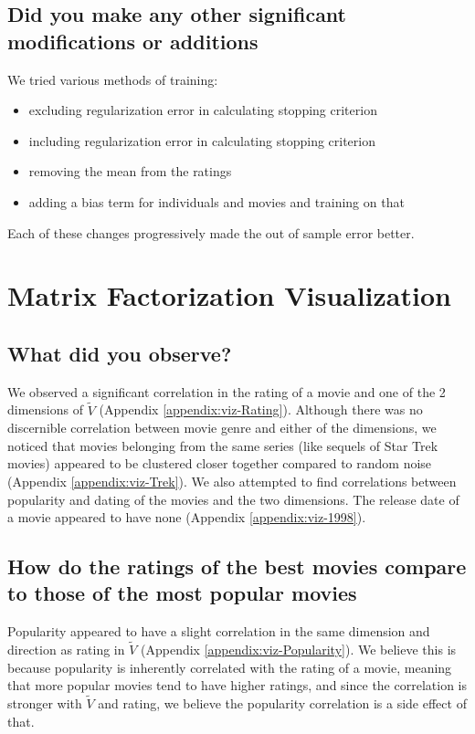 \subsection*{Did you make any other significant modifications or additions}
We tried various methods of training:
\begin{itemize}
  \item excluding regularization error in calculating stopping criterion
  \item including regularization error in calculating stopping criterion
  \item removing the mean from the ratings
  \item adding a bias term for individuals and movies and training on that
\end{itemize}
Each of these changes progressively made the out of sample error better.

\section{Matrix Factorization Visualization}
\medskip
\subsection*{What did you observe?}
We observed a significant correlation in the rating of a movie and one of the 2 dimensions of $\widetilde{V}$ (Appendix \ref{appendix:viz-Rating}). Although there was no discernible correlation between movie genre and either of the dimensions, we noticed that movies belonging from the same series (like sequels of Star Trek movies) appeared to be clustered closer together compared to random noise (Appendix \ref{appendix:viz-Trek}). We also attempted to find correlations between popularity and dating of the movies and the two dimensions. The release date of a movie appeared to have none (Appendix \ref{appendix:viz-1998}). 

\subsection*{How do the ratings of the best movies compare to those of the most popular movies}
Popularity appeared to have a slight correlation in the same dimension and direction as rating in $\widetilde{V}$ (Appendix \ref{appendix:viz-Popularity}). We believe this is because popularity is inherently correlated with the rating of a movie, meaning that more popular movies tend to have higher ratings, and since the correlation is stronger with $\widetilde{V}$ and rating, we believe the popularity correlation is a side effect of that.

